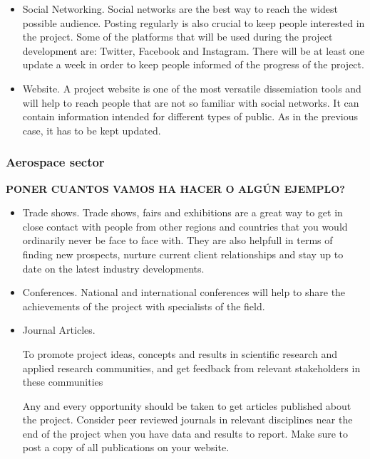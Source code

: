 \begin{itemize}
\item{ 
	Social Networking. Social networks are the best way to reach the widest possible audience. Posting regularly is also crucial to keep people interested in the project. Some of the platforms that will be used during the project development are: Twitter, Facebook and Instagram. There will be at least one update a week in order to keep people informed of the progress of the project.
}
\item {
	Website. A project website is one of the most versatile dissemiation tools and will help to reach people that are not so familiar with social networks. It can contain information intended for different types of public. As in the previous case, it has to be kept updated.
}
\end{itemize}

\subsubsection{Aerospace sector}

\textbf{PONER CUANTOS VAMOS HA HACER O ALGÚN EJEMPLO?}
\begin{itemize}

\item{
	Trade shows. Trade shows, fairs and exhibitions are a great way to get in close contact with people from other regions and countries that you would ordinarily never be face to face with. They are also helpfull in terms of finding new prospects, nurture current client relationships and stay up to date on the latest industry developments. 
}
\item {
	Conferences. National and international conferences will help to share the achievements of the project with specialists of the field.
}
\item {
	Journal Articles. 
	
	
	To promote project ideas, concepts and results in scientific research and applied research communities, and get feedback from relevant stakeholders in these communities
	
	Any and every opportunity should be taken to get articles published about the project. Consider peer reviewed journals in relevant disciplines near the end of the project when you have data and results to report. Make sure to post a copy of all publications on your website. 
}
\end{itemize}